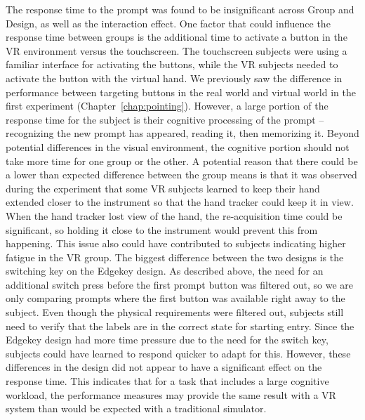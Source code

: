

The response time to the prompt was found to be insignificant across Group and Design, as well as the interaction effect.
One factor that could influence the response time between groups is the additional time to activate a button in the VR environment versus the touchscreen.
The touchscreen subjects were using a familiar interface for activating the buttons, while the VR subjects needed to activate the button with the virtual hand.
We previously saw the difference in performance between targeting buttons in the real world and virtual world in the first experiment (Chapter~\ref{chap:pointing}).
However, a large portion of the response time for the subject is their cognitive processing of the prompt -- recognizing the new prompt has appeared, reading it, then memorizing it.
Beyond potential differences in the visual environment, the cognitive portion should not take more time for one group or the other.
A potential reason that there could be a lower than expected difference between the group means is that it was observed during the experiment that some VR subjects learned to keep their hand extended closer to the instrument so that the hand tracker could keep it in view.
When the hand tracker lost view of the hand, the re-acquisition time could be significant, so holding it close to the instrument would prevent this from happening.
This issue also could have contributed to subjects indicating higher fatigue in the VR group.
The biggest difference between the two designs is the switching key on the Edgekey design.
As described above, the need for an additional switch press before the first prompt button was filtered out, so we are only comparing prompts where the first button was available right away to the subject.
Even though the physical requirements were filtered out, subjects still need to verify that the labels are in the correct state for starting entry.
Since the Edgekey design had more time pressure due to the need for the switch key, subjects could have learned to respond quicker to adapt for this.
However, these differences in the design did not appear to have a significant effect on the response time.
This indicates that for a task that includes a large cognitive workload, the performance measures may provide the same result with a VR system than would be expected with a traditional simulator.



